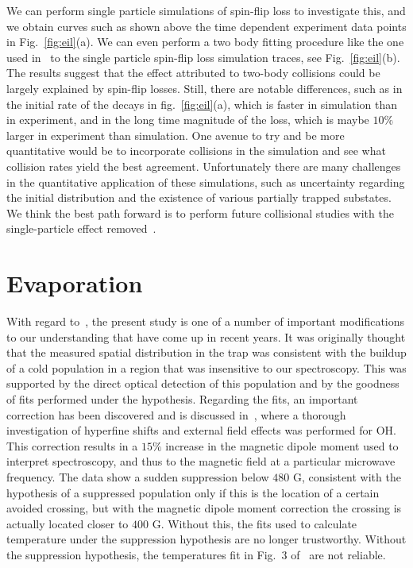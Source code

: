 \documentclass[%
 reprint,
 amsmath,amssymb,
 aps,
pra,
]{revtex4-1}
\begin{document}
We can perform single particle simulations of spin-flip loss to investigate this, and we obtain curves such as shown above the time dependent experiment data points in Fig.~\ref{fig:eil}(a).
We can even perform a two body fitting procedure like the one used in~\cite{Stuhl2013} to the single particle spin-flip loss simulation traces, see Fig.~\ref{fig:eil}(b). 
The results suggest that the effect attributed to two-body collisions could be largely explained by spin-flip losses.
Still, there are notable differences, such as in the initial rate of the decays in fig.~\ref{fig:eil}(a), which is faster in simulation than in experiment, and in the long time magnitude of the loss, which is maybe $10\%$ larger in experiment than simulation.
One avenue to try and be more quantitative would be to incorporate collisions in the simulation and see what collision rates yield the best agreement.
Unfortunately there are many challenges in the quantitative application of these simulations, such as uncertainty regarding the initial distribution and the existence of various partially trapped substates.
We think the best path forward is to perform future collisional studies with the single-particle effect removed~\cite{smt}.

\section{Evaporation}
With regard to~\cite{Stuhl2012evap}, the present study is one of a number of important modifications to our understanding that have come up in recent years. 
It was originally thought that the measured spatial distribution in the trap was consistent with the buildup of a cold population in a region that was insensitive to our spectroscopy.
This was supported by the direct optical detection of this population and by the goodness of fits performed under the hypothesis.
Regarding the fits, an important correction has been discovered and is discussed in~\cite{Maeda2015}, where a thorough investigation of hyperfine shifts and external field effects was performed for OH.
This correction results in a $15\%$ increase in the magnetic dipole moment used to interpret spectroscopy, and thus to the magnetic field at a particular microwave frequency. 
The data show a sudden suppression below $480\text{ G}$, consistent with the hypothesis of a suppressed population only if this is the location of a certain avoided crossing, but with the magnetic dipole moment correction the crossing is actually located closer to $400\text{ G}$.
Without this, the fits used to calculate temperature under the suppression hypothesis are no longer trustworthy. 
Without the suppression hypothesis, the temperatures fit in Fig.~3 of~\cite{Stuhl2012evap} are not reliable. 
\end{document}

